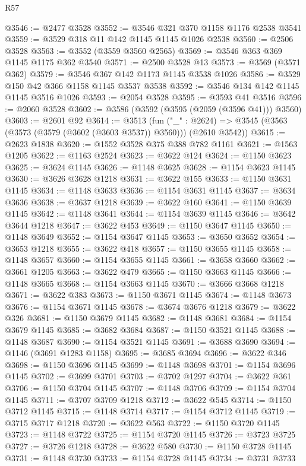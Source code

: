 \begin{lexlean}{R57}
\begin{coremodule}
@3546 := @2477 @3528
@3552 := @3546 @321 @370 @1158 @1176 @2538 @3541
@3559 := @3529 @318 @11 @142 @1145 @1145 @1026 @2538
@3560 := @2506 @3528
@3563 := @3552 (@3559 @3560 @2565)
@3569 := @3546 @363 @369 @1145 @1175 @362 @3540
@3571 := @2500 @3528 @13
@3573 := @3569 (@3571 @362)
@3579 := @3546 @367 @142 @1173 @1145 @3538 @1026
@3586 := @3529 @150 @42 @366 @1158 @1145 @3537 @3538
@3592 := @3546 @134 @142 @1145 @1145 @3516 @1026
@3593 := @2054 @3528
@3595 := @3593 @41 @3516
@3596 := @2060 @3528
@3602 := @3586 (@3592 (@3595 (@2059 (@3596 @41))) @3560)
@3603 := @2601 @92
@3614 := @3513
    (fun ("_" : @2624) => @3545 (@3563 (@3573 (@3579 (@3602 (@3603 @3537)) @3560))) (@2610 @3542))
@3615 := @2623 @1838
@3620 := @1552 @3528 @375 @388 @782 @1161
@3621 := @1563 @1205
@3622 := @1163 @2524
@3623 := @3622 @124
@3624 := @1150 @3623
@3625 := @3624 @1145
@3626 := @1148 @3625
@3628 := @1154 @3623 @1145
@3630 := @3626 @3628 @1218
@3631 := @3622 @155
@3633 := @1150 @3631 @1145
@3634 := @1148 @3633
@3636 := @1154 @3631 @1145
@3637 := @3634 @3636
@3638 := @3637 @1218
@3639 := @3622 @160
@3641 := @1150 @3639 @1145
@3642 := @1148 @3641
@3644 := @1154 @3639 @1145
@3646 := @3642 @3644 @1218
@3647 := @3622 @453
@3649 := @1150 @3647 @1145
@3650 := @1148 @3649
@3652 := @1154 @3647 @1145
@3653 := @3650 @3652
@3654 := @3653 @1218
@3655 := @3622 @418
@3657 := @1150 @3655 @1145
@3658 := @1148 @3657
@3660 := @1154 @3655 @1145
@3661 := @3658 @3660
@3662 := @3661 @1205
@3663 := @3622 @479
@3665 := @1150 @3663 @1145
@3666 := @1148 @3665
@3668 := @1154 @3663 @1145
@3670 := @3666 @3668 @1218
@3671 := @3622 @383
@3673 := @1150 @3671 @1145
@3674 := @1148 @3673
@3676 := @1154 @3671 @1145
@3678 := @3674 @3676 @1218
@3679 := @3622 @326
@3681 := @1150 @3679 @1145
@3682 := @1148 @3681
@3684 := @1154 @3679 @1145
@3685 := @3682 @3684
@3687 := @1150 @3521 @1145
@3688 := @1148 @3687
@3690 := @1154 @3521 @1145
@3691 := @3688 @3690
@3694 := @1146 (@3691 @1283 @1158)
@3695 := @3685 @3694
@3696 := @3622 @346
@3698 := @1150 @3696 @1145
@3699 := @1148 @3698
@3701 := @1154 @3696 @1145
@3702 := @3699 @3701
@3703 := @3702 @1297
@3704 := @3622 @361
@3706 := @1150 @3704 @1145
@3707 := @1148 @3706
@3709 := @1154 @3704 @1145
@3711 := @3707 @3709 @1218
@3712 := @3622 @545
@3714 := @1150 @3712 @1145
@3715 := @1148 @3714
@3717 := @1154 @3712 @1145
@3719 := @3715 @3717 @1218
@3720 := @3622 @563
@3722 := @1150 @3720 @1145
@3723 := @1148 @3722
@3725 := @1154 @3720 @1145
@3726 := @3723 @3725
@3727 := @3726 @1218
@3728 := @3622 @580
@3730 := @1150 @3728 @1145
@3731 := @1148 @3730
@3733 := @1154 @3728 @1145
@3734 := @3731 @3733

\end{coremodule}
\end{lexlean}
